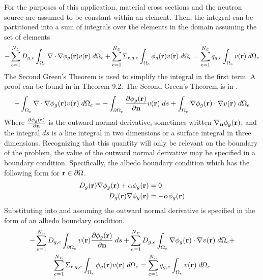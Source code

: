     For the purposes of this application, material cross sections and the
    neutron source are assumed to be constant within an element. Then, the 
    integral can be partitioned into a sum of integrals over the elements in the
    domain assuming the set of elements 
    \begin{equation} \label{eq:element_by_element}
      -\sum_{e=1}^{N_E} D_{g,e} 
        \int_{\Omega_e} \mathbf{\nabla} \cdot \mathbf{\nabla} \phi_g(\mathbf{r}) v(\mathbf{r}) \; d\Omega_e +
        \sum_{e=1}^{N_E} \Sigma_{r,g,e} \int_{\Omega_e} \phi_g(\mathbf{r}) v(\mathbf{r}) 
        \;d\Omega_e = \sum_{e=1}^{N_E} q_{g,e} \int_{\Omega_e} v(\mathbf{r}) 
        \; d\Omega_e
    \end{equation}
    The Second Green's Theorem is used to simplify the integral in the first
    term. A proof can be found in \cite{textbookli} in Theorem 9.2. The Second 
    Green's Theorem is in .
    \begin{equation} \label{eq:greens}
      -\int_{\Omega_e} \mathbf{\nabla} \cdot \mathbf{\nabla} \phi_g(\mathbf{r}) v(\mathbf{r}) \;d\Omega_e =
        -\int_{\partial \Omega_e}  
        \frac{\partial \phi_g(\mathbf{r})}{\partial \mathbf{n}} v(\mathbf{r})\; ds + \int_{\Omega_e} 
        \mathbf{\nabla} \phi_g(\mathbf{r}) \cdot \mathbf{\nabla} v(\mathbf{r}) \; d\Omega_e
    \end{equation}
    Where $\frac{\partial \phi_g(\mathbf{r})}{\partial \mathbf{n}}$ is the outward normal 
    derivative, sometimes written $\mathbf{\nabla}_{\mathbf{n}} \phi_g(\mathbf{r})$, and the integral 
    $ds$ is a line integral in two dimensions or a surface integral in three 
    dimensions. Recognizing that this quantity will only be relevant on the 
    boundary of the problem, the value of the outward normal derivative may be 
    specified in a boundary condition. Specifically, the albedo boundary 
    condition which has the following form for $\mathbf{r} \in \partial \Omega$. 
    \begin{align}
      D_g(\mathbf{r}) \mathbf{\nabla} \phi_g(\mathbf{r}) + \alpha \phi_g(\mathbf{r}) &= 0 \\
      D_g(\mathbf{r}) \mathbf{\nabla} \phi_g(\mathbf{r}) &= -\alpha \phi_g(\mathbf{r})
    \end{align}
    Substituting  into   and 
    assuming the outward normal derivative is specified in the form of an albedo
    boundary condition.
    \begin{multline} 
      -\sum_{e=1}^{N_E} D_{g,e} \int_{\partial \Omega_e} v(\mathbf{r}) 
        \frac{\partial \phi_g(\mathbf{r})}{\partial \mathbf{n}} \;ds + \sum_{e=1}^{N_E} D_{g,e}
        \int_{\Omega_e} \mathbf{\nabla} \phi_g(\mathbf{r}) \cdot \mathbf{\nabla} v(\mathbf{r}) \; d\Omega_e + \\
        \sum_{e=1}^{N_E} \Sigma_{r,g,e} \int_{\Omega_e} \phi_g(\mathbf{r}) v(\mathbf{r}) 
        \; d\Omega_e =
        \sum_{e=1}^{N_E} q_{g,e} \int_{\Omega_e} v(\mathbf{r}) \; d\Omega_e
    \end{multline}
